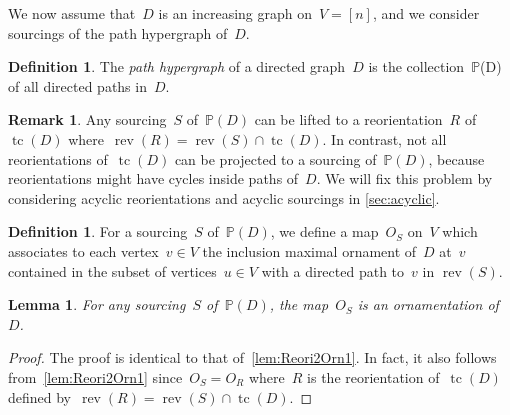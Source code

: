 \documentclass{amsart}
\newtheorem{lemma}[theorem]{Lemma}
\theoremstyle{definition}
\newtheorem{definition}[theorem]{Definition}
\newtheorem{remark}[theorem]{Remark}
\newcommand{\ssm}{\smallsetminus} %
\DeclareMathOperator{\tc}{tc} %
\newcommand{\darkblue}{\color{darkblue}} %
\newcommand{\defn}[1]{\textsl{\darkblue #1}} %
\DeclareMathOperator{\rev}{rev} %
\newcommand{\II}{\mathbb I} %
\newcommand{\PP}{\mathbb P} %
\begin{document}
%

We now assume that~$D$ is an increasing graph on~$V = [n]$, and we consider sourcings of the path hypergraph of~$D$.

\begin{definition}
The \defn{path hypergraph} of a directed graph~$D$ is the collection~$\PP$(D) of all directed paths in~$D$.
\end{definition}

\begin{remark}
Any sourcing~$S$ of~$\PP(D)$ can be lifted to a reorientation~$R$ of~$\tc(D)$ where~$\rev(R) = \rev(S) \cap \tc(D)$.
In contrast, not all reorientations of~$\tc(D)$ can be projected to a sourcing of~$\PP(D)$, because reorientations might have cycles inside paths of~$D$.
We will fix this problem by considering acyclic reorientations and acyclic sourcings in \cref{sec:acyclic}.
\end{remark}

\begin{definition}
\label{def:Sourc2Orn}
For a sourcing~$S$ of~$\PP(D)$, we define a map~$O_{\!S}$ on~$V$ which associates to each vertex~$v \in V$ the inclusion maximal ornament of~$D$ at~$v$ contained in the subset of vertices~$u \in V$ with a directed path to~$v$ in $\rev(S)$. %
\end{definition}

\begin{lemma}
\label{lem:Sour2Orn2}
For any sourcing~$S$ of~$\PP(D)$, the map~$O_{\!S}$ is an ornamentation of~$D$.
\end{lemma}

\begin{proof}
The proof is identical to that of~\cref{lem:Reori2Orn1}.
In fact, it also follows from~\cref{lem:Reori2Orn1} since~$O_{\!S} = O_{\!R}$ where~$R$ is the reorientation of~$\tc(D)$ defined by~$\rev(R) = \rev(S) \cap \tc(D)$.
\end{proof}
\end{document}
